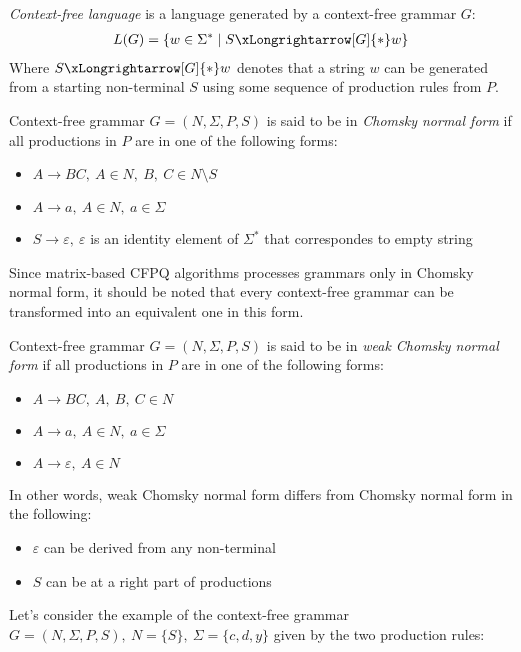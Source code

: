 \begin{definition} \emph{Context-free language} is a language generated by a context-free grammar $G$:
\begin{align*}
     L(G) = \{w \in \Sigma^* \mid S \xLongrightarrow[G]{*} w \} 
\end{align*}
Where $S \xLongrightarrow[G]{*} w$  denotes that a string $w$ can be generated from a starting non-terminal $S$ using some sequence of production rules from $P$.
\end{definition}

\begin{definition} Context-free grammar $G = (N, \Sigma, P, S)$ is said to be in \emph{Chomsky normal form} if all productions in $P$ are in one of the following forms:
    \begin{itemize}
        \item $A \rightarrow BC,~A \in N,~B,~C \in N \setminus S$
        \item  $A \rightarrow a,~A \in N,~a \in \Sigma$
        \item $S \rightarrow \varepsilon,~\varepsilon$ is an identity element of $\Sigma^*$ that correspondes to empty string
    \end{itemize}
\end{definition}
 Since matrix-based CFPQ algorithms processes grammars only in Chomsky normal form, it should be noted that every context-free grammar can be transformed into an equivalent one in this form. 
\begin{definition} Context-free grammar $G = (N, \Sigma, P, S)$ is said to be in \emph{weak Chomsky normal form} if all productions in $P$ are in one of the following forms:
    \begin{itemize}
        \item $A \rightarrow BC,~A,~B,~C \in N$
        \item  $A \rightarrow a,~A \in N,~a \in \Sigma$
        \item $A \rightarrow \varepsilon,~A \in N$
    \end{itemize}
\end{definition}
In other words, weak Chomsky normal form differs from Chomsky normal form in the following:
\begin{itemize}
    \item $\varepsilon$ can be derived from any non-terminal
    \item $S$ can be at a right part of productions
\end{itemize}
Let's consider the example of the context-free grammar $G=(N, \Sigma, P, S), ~N=\{S\},~\Sigma=\{c, d, y\}$ given by the two production rules: 
